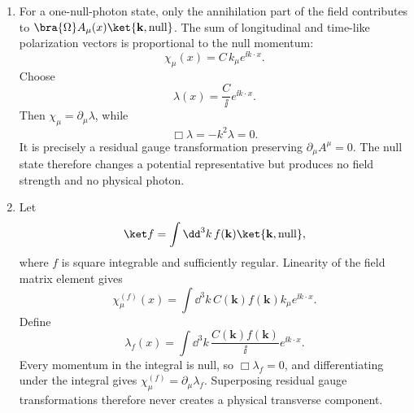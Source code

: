 \begin{enumerate}
\begin{enumerate}
\(b_+^\dagger\).  Its inner product with any physical state vanishes:
after Hermitian conjugation, a \(b_+\) can be commuted through all
transverse and \(b_+^\dagger\) operators without producing a number, and
then annihilates the vacuum.  Thus the null vectors form a radical of the
inner product.  The quotient
\[
 \mathcal H_{\rm phys}=\mathcal H_{\rm small}/\mathcal N
\]
is represented uniquely by transverse states and has a positive-definite
inner product with exactly two photon polarizations.
\item
For a one-null-photon state, only the annihilation part of the field
contributes to
\(\bra{\Omega}A_\mu(x)\ket{\mathbf k,\mathrm{null}}\).
The sum of longitudinal and time-like polarization vectors is proportional
to the null momentum:
\[
 \chi_\mu(x)=C\,k_\mu e^{\ii k\cdot x}.
\]
Choose
\[
 \lambda(x)=\frac{C}{\ii}e^{\ii k\cdot x}.
\]
Then \(\chi_\mu=\partial_\mu\lambda\), while
\[
 \Box\lambda=-k^2\lambda=0.
\]
It is precisely a residual gauge transformation preserving
\(\partial_\mu A^\mu=0\).  The null state therefore changes a potential
representative but produces no field strength and no physical photon.
\item
Let
\[
 \ket f=\int \dd^3k\,f(\mathbf k)
 \ket{\mathbf k,\mathrm{null}},
\]
where \(f\) is square integrable and sufficiently regular.  Linearity of
the field matrix element gives
\[
 \chi_\mu^{(f)}(x)
 =\int \dd^3k\,C(\mathbf k)f(\mathbf k)
 k_\mu e^{\ii k\cdot x}.
\]
Define
\[
 \lambda_f(x)=\int \dd^3k\,
 \frac{C(\mathbf k)f(\mathbf k)}{\ii}e^{\ii k\cdot x}.
\]
Every momentum in the integral is null, so
\(\Box\lambda_f=0\), and differentiating under the integral gives
\(\chi_\mu^{(f)}=\partial_\mu\lambda_f\).  Superposing residual gauge
transformations therefore never creates a physical transverse component.
\end{enumerate}


\end{enumerate}
